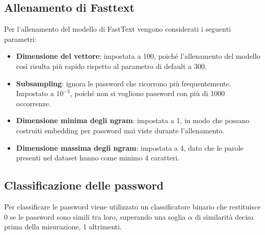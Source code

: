 \subsection{Allenamento di Fasttext}
Per l'allenamento del modello di FastText vengono considerati i seguenti parametri:

\begin{itemize}
    \item \textbf{Dimensione del vettore}: impostata a 100, poiché l'allenamento del modello così risulta più rapido rispetto al parametro di default a 300.
    \item \textbf{Subsampling}: ignora le password che ricorrono più frequentemente. Impostato a $10^{-3}$, poiché non si vogliono password con più di 1000 occorrenze.
    \item \textbf{Dimensione minima degli ngram}: impostata a 1, in modo che possano costruiti embedding per password mai viste durante l'allenamento.
    \item \textbf{Dimensione massima degli ngram}: impostata a 4, dato che le parole presenti nel dataset hanno come minimo 4 caratteri.
\end{itemize}
\subsection{Classificazione delle password}
Per classificare le password viene utilizzato un classificatore binario che restituisce 0 se le password sono simili tra loro, superando una soglia $\alpha$ di similarità decisa prima della misurazione, 1 altrimenti.

